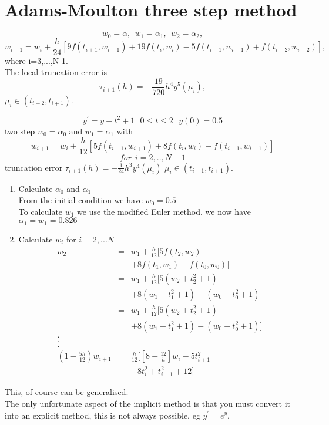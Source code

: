 \section*{Adams-Moulton three step method}
\[ w_0=\alpha, \ \ w_1=\alpha_1, \ \ w_2 = \alpha_2, \]
\[w_{i+1} = w_{i}+\frac{h}{24}[9f(t_{i+1},w_{i+1}) +19 f(t_{i},w_{i})-5f(t_{i-1},w_{i-1})+f(t_{i-2},w_{i-2})  ], \]
where i=3,...,N-1.\\
The local truncation error is 
\[\tau_{i+1}(h) =-\frac{19}{720}h^4 y^5(\mu_i),\]
$\mu_i \in (t_{i-2},t_{i+1}).$
\begin{example}
\[ y^{'}=y-t^2+1 \ \ \ 0 \leq t \leq 2 \ \ \ y(0)=0.5 \]
 two step
$w_0=\alpha_0$ and $w_1=\alpha_1$ with
\[w_{i+1}=w_i+\frac{h}{12}[5f(t_{i+1},w_{i+1})+8f(t_{i},w_{i})-f(t_{i-1},w_{i-1})] \] 
\[  for \ \ i=2,..,N-1 \]
truncation error  $ \tau_{i+1}(h)=-\frac{1}{24}h^3 y^4(\mu_i)$ $\mu_i \in (t_{i-1},t_{i+1})$.
\begin{enumerate}
\item Calculate $\alpha_0$ and $\alpha_1$ \\
From the initial condition we have $w_0=0.5$\\
To calculate $w_1$ we use the modified Euler method.
we now have $\alpha_1=w_1=0.826$
\item Calculate $w_i$ for $i=2,...N$
\begin{eqnarray*}
w_{2}&=&w_1+\frac{h}{12}[5f(t_{2},w_{2})\\
& & +8 f(t_{1},w_{1})-f(t_{0},w_{0}) ] \\
&=&w_1+\frac{h}{12}[5(w_{2}+t_2^2+1) \\
& & +8 (w_{1}+t_1^2+1)-(w_{0}+t_0^2+1) ] \\
&=&w_1+\frac{h}{12}[5(w_{2}+t_2^2+1)\\ 
& & +8 (w_{1}+t_1^2+1)-(w_{0}+t_0^2+1) ] \\
.\\
.\\
.\\
(1-\frac{5h}{12})w_{i+1}&=&\frac{h}{12}[[8+\frac{12}{h}]w_{i}-5t_{i+1}^2\\
& & -8t_{i}^2+t_{i-1}^2+12] 
\end{eqnarray*}
\end{enumerate}
\end{example}
This, of course can be generalised.\\
The only unfortunate aspect of the implicit method is that you must convert it into an explicit method, this is not always possible. eg $y^{'}=e^y$.

